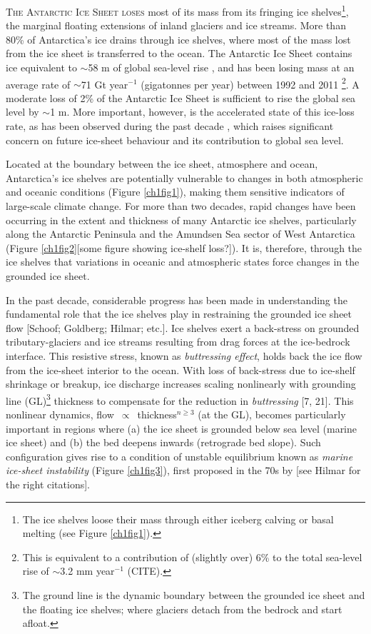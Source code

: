 \lettrine[lines=2]{T}{he Antarctic Ice Sheet loses} most of its mass from its fringing ice shelves\footnote{
The ice shelves loose their mass through either iceberg calving or basal melting
(see Figure \ref{ch1fig1}).},
the marginal floating extensions of inland glaciers and ice streams. More than 80\% of
Antarctica's ice drains through ice shelves, where most of the mass
lost from the ice sheet is transferred to the ocean. The Antarctic Ice Sheet
contains ice equivalent to $\sim$58 m of global sea-level rise
\parencite{Fretwell2013}, and has been losing mass at an average rate of
$\sim$71 Gt year$^{-1}$ (gigatonnes per year) between 1992 and 2011
\parencite{Shepherd2012}\footnote{This is equivalent to a contribution of
(slightly over) 6\% to the total sea-level rise of $\sim$3.2 mm year$^{-1}$
(CITE).}. A moderate loss of 2\% of the Antarctic Ice Sheet is sufficient to rise
the global sea level by $\sim$1 m. More important, however, is the accelerated
state of this ice-loss rate, as has been observed during the past decade
\parencite{Shepherd2012, Sutterley2014, Velicogna2009, Chen2009, Harig2015}, 
which raises significant concern on future ice-sheet behaviour and its
contribution to global sea level. 

Located at the boundary between the ice sheet, atmosphere and ocean,
Antarctica's ice shelves are potentially vulnerable to changes in both
atmospheric and oceanic conditions (Figure \ref{ch1fig1}), making them sensitive indicators of
large-scale climate change. For more than two decades, rapid
changes have been occurring in the extent and thickness of many Antarctic ice
shelves, particularly along the Antarctic Peninsula and the Amundsen Sea
sector of West Antarctica \parencite{Cook2010, Pritchard2012, Shepherd2010,
Wingham2009, Zwally2005, Fricker2012}(Figure \ref{ch1fig2}[some figure
showing ice-shelf loss?]). It is, therefore, through the ice shelves that variations in
oceanic and atmospheric states force changes in the grounded ice sheet.

In the past decade, considerable progress has been made in understanding the
fundamental role that the ice shelves play in restraining the grounded ice sheet
flow [Schoof; Goldberg; Hilmar; etc.]. Ice shelves exert a back-stress on
grounded tributary-glaciers and ice streams resulting from drag forces
at the ice-bedrock interface. This resistive stress, known as \emph{buttressing effect},
holds back the ice flow from the ice-sheet interior to the ocean.
With loss of back-stress due to ice-shelf shrinkage or breakup, ice discharge
increases scaling nonlinearly with grounding line (GL)\footnote{The ground line
is the dynamic boundary between the grounded ice sheet and the floating ice shelves;
where glaciers detach from the bedrock and start afloat.} thickness to
compensate for the reduction in \emph{buttressing} [7, 21]. This nonlinear dynamics,
flow~$\propto$~thickness$^{n \geqslant 3}$ (at the GL), becomes particularly important in
regions where (a) the ice sheet is
grounded below sea level (marine ice sheet) and (b) the bed deepens inwards
(retrograde bed slope). Such configuration gives rise to a condition of unstable
equilibrium known as \emph{marine ice-sheet instability} (Figure \ref{ch1fig3}),
first proposed in the 70s by [see Hilmar for the right citations].

